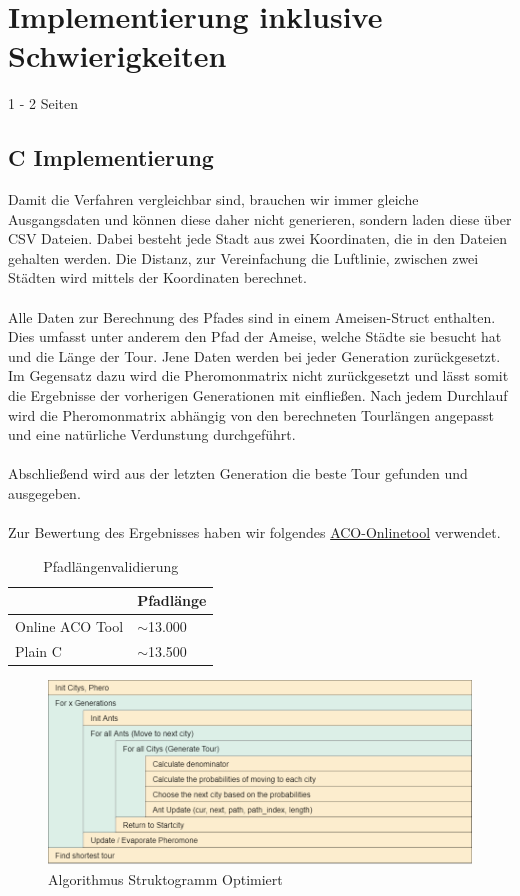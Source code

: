 \section{Implementierung inklusive Schwierigkeiten}
1 - 2 Seiten\\
\subsection*{C Implementierung}

Damit die Verfahren vergleichbar sind, brauchen wir immer gleiche Ausgangsdaten und können diese daher nicht generieren, sondern laden diese über CSV Dateien.
Dabei besteht jede Stadt aus zwei Koordinaten, die in den Dateien gehalten werden.
Die Distanz, zur Vereinfachung die Luftlinie, zwischen zwei Städten wird mittels der Koordinaten berechnet.
\\\\
Alle Daten zur Berechnung des Pfades sind in einem Ameisen-Struct enthalten.
Dies umfasst unter anderem den Pfad der Ameise, welche Städte sie besucht hat und die Länge der Tour.
Jene Daten werden bei jeder Generation zurückgesetzt.
Im Gegensatz dazu wird die Pheromonmatrix nicht zurückgesetzt und lässt somit die Ergebnisse der vorherigen Generationen mit einfließen.
Nach jedem Durchlauf wird die Pheromonmatrix abhängig von den berechneten Tourlängen angepasst und eine natürliche Verdunstung durchgeführt.
\\\\
Abschließend wird aus der letzten Generation die beste Tour gefunden und ausgegeben.
\\\\
Zur Bewertung des Ergebnisses haben wir folgendes \href{https://poolik.github.io/visual-aco/}{ACO-Onlinetool} verwendet. 
\begin{table}[h]
    \centering
    \begin{tabular}{|l|l|}
    \hline
                    & Pfadlänge    \\ \hline
    Online ACO Tool & $\sim$13.000 \\ \hline
    Plain C         & $\sim$13.500 \\ \hline
    \end{tabular}
    \caption{\label{demo-table}Pfadlängenvalidierung}
\end{table}

\begin{figure}[H]
    \centering
    \includegraphics[width=16cm]{../images/struktog-optimiert.png}
    \caption{Algorithmus Struktogramm Optimiert}
    \label{fig:struktogramm-optimiert}
\end{figure}

